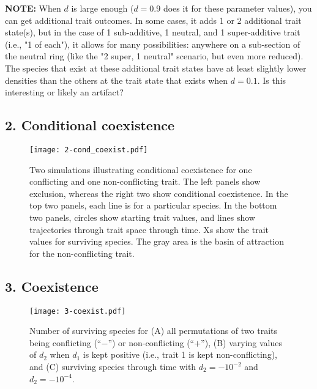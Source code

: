 \textbf{NOTE:} When $d$ is large enough ($d = 0.9$ does it for these parameter values),
you can get additional trait outcomes.
In some cases, it adds 1 or 2 additional trait state(s), but in the case
of 1 sub-additive, 1 neutral, and 1 super-additive trait (i.e., "1 of each"),
it allows for many possibilities:
anywhere on a sub-section of the neutral ring (like
the "2 super, 1 neutral" scenario, but even more reduced).
The species that exist at these additional trait states
have at least slightly lower densities than the others at the trait state
that exists when $d = 0.1$.
Is this interesting or likely an artifact?



\subsection*{2. Conditional coexistence}

\begin{figure}[ht!]
\centering
\texttt{[image: 2-cond\_coexist.pdf]}
\caption{Two simulations illustrating conditional coexistence for one
    conflicting and one non-conflicting trait.
    The left panels show exclusion, whereas the right two show
    conditional coexistence.
    In the top two panels, each line is for a particular species.
    In the bottom two panels, circles show starting trait values,
    and lines show trajectories through trait space through time.
    Xs show the trait values for surviving species.
    The gray area is the basin of attraction for the
    non-conflicting trait.}
\label{fig:cond-coexist}
\end{figure}


\subsection*{3. Coexistence}


\begin{figure}[ht!]
\centering
\texttt{[image: 3-coexist.pdf]}
\caption{Number of surviving species for
    (A) all permutations of two traits being conflicting (``$-$'')
    or non-conflicting (``$+$''),
    (B) varying values of $d_2$ when $d_1$ is kept positive
    (i.e., trait 1 is kept non-conflicting), and
    (C) surviving species through time with $d_2 = -10^{-2}$ and
    $d_2 = -10^{-4}$.}
\label{fig:coexist}
\end{figure}


